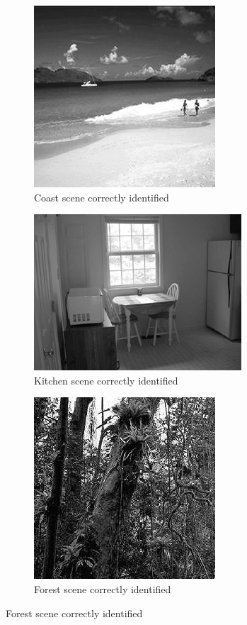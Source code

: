 \begin{homeworkProblem}
  \begin{figure}[H]
    \begin{subfigure}{0.5\textwidth}
      \centering
      \caption{Coast scene correctly identified}
      \includegraphics[width=.5\linewidth]{./images/own/coast_match_1.jpg}
    \end{subfigure}%
    \begin{subfigure}{0.5\textwidth}
      \centering
      \caption{Kitchen scene correctly identified}
      \includegraphics[width=.5\linewidth]{./images/own/kitche_match_2.jpg}
    \end{subfigure}
    \begin{subfigure}{0.5\textwidth}
      \centering
      \caption{Forest scene correctly identified}
      \includegraphics[width=.5\linewidth]{./images/own/forest_match_3.jpg}

\end{subfigure}
\end{figure}
\end{homeworkProblem}
